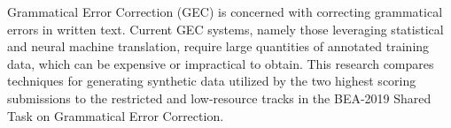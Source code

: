 Grammatical Error Correction (GEC) is concerned with correcting grammatical errors in written text. Current GEC systems, namely those leveraging statistical and neural machine translation, require large quantities of annotated training data, which can be expensive or impractical to obtain. This research compares techniques for generating synthetic data utilized by the two highest scoring submissions to the restricted and low-resource tracks in the BEA-2019 Shared Task on Grammatical Error Correction.
